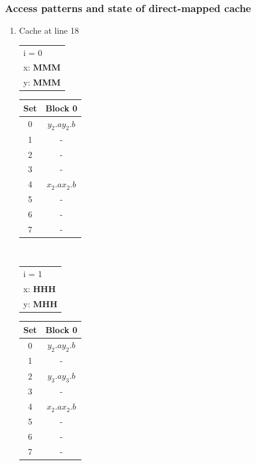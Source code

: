 \subsubsection{Access patterns and state of direct-mapped cache}
\begin{enumerate}[label=\roman*. ]
\item Cache at line 18\\
\begin{table}[h!]
\begin{tabular}[t]{l}
    i = 0\\
    x: \textbf{MMM}\\
    y: \textbf{MMM}\\
\end{tabular}
\begin{tabular}[t]{|c|c|}
    Set & Block 0 \\ \hline
    0 & $y_2.a$\quad$y_2.b$ \\ \hline
    1 & - \\ \hline
    2 & - \\ \hline
    3 & - \\ \hline
    4 & $x_2.a$\quad$x_2.b$ \\ \hline
    5 & - \\ \hline
    6 & - \\ \hline
    7 & - \\ \hline
    \end{tabular}
\end{table}\\
\begin{table}[h!]
    \begin{tabular}[t]{l}
        i = 1\\
        x: \textbf{HHH}\\
        y: \textbf{MHH}\\
    \end{tabular}
    \begin{tabular}[t]{|c|c|}
    Set & Block 0 \\ \hline
    0 & $y_2.a$\quad$y_2.b$ \\ \hline
    1 & - \\ \hline
    2 & $y_3.a$\quad$y_3.b$ \\ \hline
    3 & - \\ \hline
    4 & $x_2.a$\quad$x_2.b$ \\ \hline
    5 & - \\ \hline
    6 & - \\ \hline
    7 & - \\ \hline
    \end{tabular}

\end{table}
\end{enumerate}
